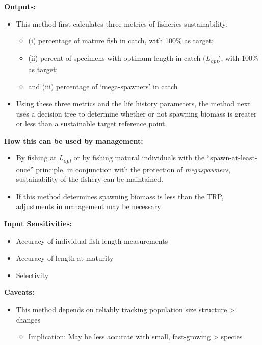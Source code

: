 \documentclass[]{book}
\providecommand{\tightlist}{%
  \setlength{\itemsep}{0pt}\setlength{\parskip}{0pt}}
\begin{document}
\textbf{Outputs: }

\begin{itemize}
\item
  This method first calculates three metrics of fisheries
  sustainability:

  \begin{itemize}
  \item
    (i) percentage of mature fish in catch, with 100\% as target;
  \item
    (ii) percent of specimens with optimum length in catch
    (\emph{L\textsubscript{opt}}), with 100\% as target;
  \item
    and (iii) percentage of `mega-spawners' in catch
  \end{itemize}
\item
  Using these three metrics and the life history parameters, the method
  next uses a decision tree to determine whether or not spawning biomass
  is greater or less than a sustainable target reference point.
\end{itemize}

\textbf{How this can be used by management:}

\begin{itemize}
\tightlist
\item
  By fishing at \emph{L\textsubscript{opt}} or by fishing matural
  individuals with the ``spawn-at-least-once'' principle, in conjunction
  with the protection of \emph{megaspawners}, sustainability of the
  fishery can be maintained.
\item
  If this method determines spawning biomass is less than the TRP,
  adjustments in management may be necessary
\end{itemize}

\textbf{Input Sensitivities:}

\begin{itemize}
\item
  Accuracy of individual fish length measurements
\item
  Accuracy of length at maturity
\item
  Selectivity
\end{itemize}

\textbf{Caveats:}

\begin{itemize}
\item
  This method depends on reliably tracking population size structure
  \textgreater{} changes

  \begin{itemize}
  \tightlist
  \item
    Implication: May be less accurate with small, fast-growing
    \textgreater{} species
  \end{itemize}
\end{itemize}
\end{document}
